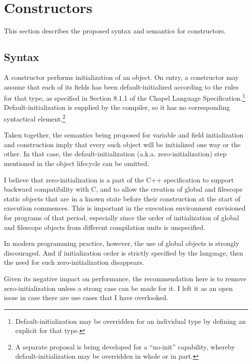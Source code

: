 \section{Constructors}
\label{Constructors}

This section describes the proposed syntax and semantics for constructors.

\subsection{Syntax}
\label{Constructors_Syntax}

A constructor performs initialization of an object.  On entry, a
constructor may assume that each of its fields has been default-initialized according to the
rules for that type, as specified in Section 8.1.1 of the Chapel Language
Specification.\footnote{Default-initialization may be overridden for an individual type by
  defining an explicit  for that type.}
Default-initialization is supplied by the compiler, so it has no corresponding syntactical
element.\footnote{A separate proposal is being developed for a ``no-init'' capability,
  whereby default-initialization may be overridden in whole or in part.}

\begin{openissue}
Taken together, the semantics being proposed for variable and field initialization and
construction imply that every such object will be initialized one way or the other.  In
that case, the default-initialization (a.k.a. zero-initialization) step mentioned in the
object lifecycle can be omitted.

I believe that zero-initialization is a part of the C++ specification to support backward
compatibility with C, and to allow the creation of global and filescope static objects
that are in a known state before their construction at the start of execution commences.
This is important in the execution environment envisioned for programs of that period,
especially since the order of initialization of global and filescope objects from
different compilation units is unspecified.

In modern programming practice, however, the use of global objects is strongly
discouraged.  And if initialization order is strictly specified by the language, then the
need for such zero-initialization disappears.  

Given its negative impact on performance, the recommendation here is to remove
zero-initialization unless a strong case can be made for it.  I left it as an open
issue in case there are use cases that I have overlooked.
\end{openissue}

